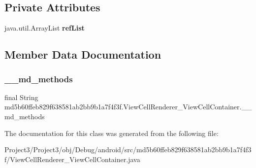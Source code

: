 \subsection*{Private Attributes}
\begin{DoxyCompactItemize}
\item 
\mbox{\label{classmd5b60ffeb829f638581ab2bb9b1a7f4f3f_1_1ViewCellRenderer__ViewCellContainer_a28b975f2cd679e8f5307b875c6f704f7}} 
java.\+util.\+Array\+List {\bfseries ref\+List}
\end{DoxyCompactItemize}


\subsection{Member Data Documentation}
\mbox{\label{classmd5b60ffeb829f638581ab2bb9b1a7f4f3f_1_1ViewCellRenderer__ViewCellContainer_a1f62af5d260be844bb21e32402dd820b}} 
\subsubsection{\texorpdfstring{\+\_\+\+\_\+md\+\_\+methods}{\_\_md\_methods}}
{\footnotesize\ttfamily final String md5b60ffeb829f638581ab2bb9b1a7f4f3f.\+View\+Cell\+Renderer\+\_\+\+View\+Cell\+Container.\+\_\+\+\_\+md\+\_\+methods\hspace{0.3cm}{\ttfamily [static]}}



The documentation for this class was generated from the following file\+:\begin{DoxyCompactItemize}
\item 
Project3/\+Project3/obj/\+Debug/android/src/md5b60ffeb829f638581ab2bb9b1a7f4f3f/View\+Cell\+Renderer\+\_\+\+View\+Cell\+Container.\+java\end{DoxyCompactItemize}
